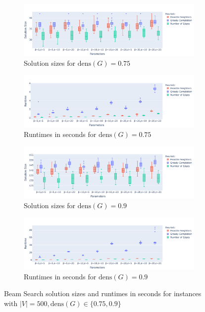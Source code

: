 \documentclass[draft,final]{vutinfth} %
\begin{document}
\begin{figure}
    \centering
    \begin{subfigure}{0.94\textwidth}
        \centering
        \includegraphics[width=\textwidth]{graphics/lbh-075-500-size.pdf}
        \caption{Solution sizes for $\mathrm{dens}(G)=0.75$}
    \end{subfigure}
    \begin{subfigure}{0.94\textwidth}
        \centering
        \includegraphics[width=\textwidth]{graphics/lbh-075-500-runtime.pdf}
        \caption{Runtimes in seconds for $\mathrm{dens}(G)=0.75$}
    \end{subfigure}
    \centering
    \begin{subfigure}{0.94\textwidth}
        \centering
        \includegraphics[width=\textwidth]{graphics/lbh-09-500-size.pdf}
        \caption{Solution sizes for $\mathrm{dens}(G)=0.9$}
    \end{subfigure}
    \begin{subfigure}{0.94\textwidth}
        \centering
        \includegraphics[width=\textwidth]{graphics/lbh-09-500-runtime.pdf}
        \caption{Runtimes in seconds for $\mathrm{dens}(G)=0.9$}
    \end{subfigure}
    \caption{Beam Search solution sizes and runtimes in seconds for instances with $|V|=500, \mathrm{dens}(G) \in \{0.75, 0.9\}$}
    \label{fig:bs-heuristics-random-1}
\end{figure}
\end{document}
